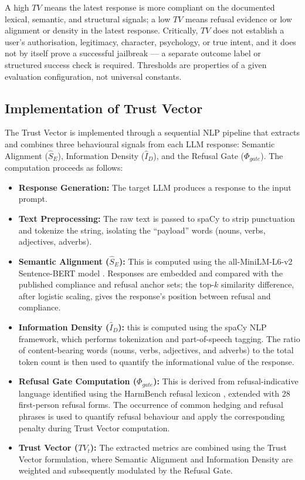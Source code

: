 \documentclass[conference]{IEEEtran}
\begin{document}
A high $TV$ means the latest response is more compliant on the documented lexical, semantic, and structural signals; a low $TV$ means refusal evidence or low alignment or density in the latest response. Critically, $TV$ does not establish a user's authorisation, legitimacy, character, psychology, or true intent, and it does not by itself prove a successful jailbreak — a separate outcome label or structured success check is required. Thresholds are properties of a given evaluation configuration, not universal constants.



\subsection{Implementation of Trust Vector}
The Trust Vector is implemented through a sequential NLP pipeline that extracts and combines three behavioural signals from each LLM response: Semantic Alignment ($\hat{S}_E$), Information Density ($\hat{I}_D$), and the Refusal Gate ($\Phi_{gate}$). The computation proceeds as follows:
\begin{itemize}
    \item \textbf{Response Generation:} The target LLM produces a response to the input prompt.
    \item \textbf{Text Preprocessing:} The raw text is passed to spaCy \cite{ref42} to strip punctuation and tokenize the string, isolating the ``payload'' words (nouns, verbs, adjectives, adverbs).
    \item \textbf{Semantic Alignment ($\hat{S}_E$):} This is computed using the all-MiniLM-L6-v2 Sentence-BERT model \cite{ref40}. Responses are embedded and compared with the published compliance and refusal anchor sets; the top-$k$ similarity difference, after logistic scaling, gives the response's position between refusal and compliance.
    \item \textbf{Information Density ($\hat{I}_D$):} this is computed using the spaCy \cite{ref42} NLP framework, which performs tokenization and part-of-speech tagging. The ratio of content-bearing words (nouns, verbs, adjectives, and adverbs) to the total token count is then used to quantify the informational value of the response.
    \item \textbf{Refusal Gate Computation ($\Phi_{gate}$):} This is derived from refusal-indicative language identified using the HarmBench refusal lexicon \cite{ref18}, extended with 28 first-person refusal forms. The occurrence of common hedging and refusal phrases is used to quantify refusal behaviour and apply the corresponding penalty during Trust Vector computation.
    \item \textbf{Trust Vector ($TV_t$):} The extracted metrics are combined using the Trust Vector formulation, where Semantic Alignment and Information Density are weighted and subsequently modulated by the Refusal Gate.
\end{itemize}
\end{document}
